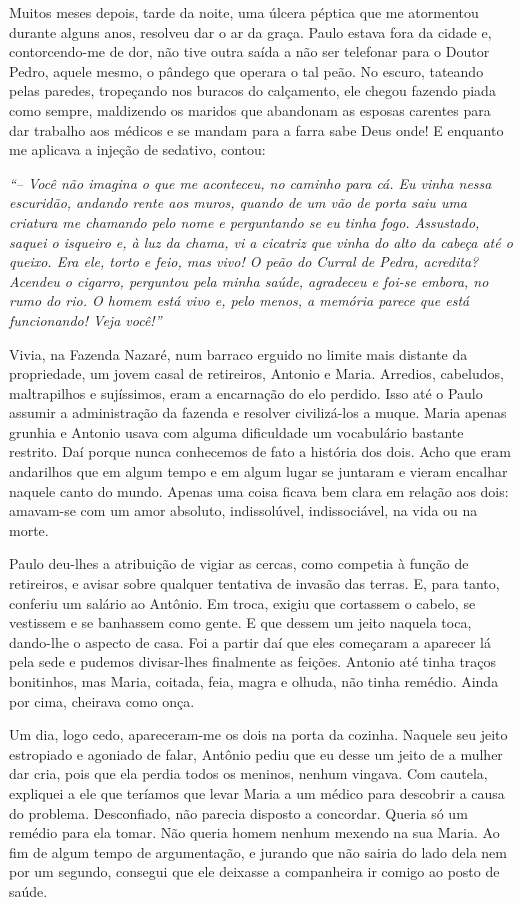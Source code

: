 Muitos meses depois, tarde da noite, uma úlcera péptica que me atormentou durante alguns anos, resolveu dar o ar da graça.
Paulo estava fora da cidade e, contorcendo-me de dor, não tive outra saída a não ser telefonar para o Doutor Pedro, aquele mesmo, o pândego que operara o tal peão.
No escuro, tateando pelas paredes, tropeçando nos buracos do calçamento, ele chegou fazendo piada como sempre, maldizendo os maridos que abandonam as esposas carentes para dar trabalho aos médicos e se mandam para a farra sabe Deus onde!  E enquanto me aplicava a injeção de sedativo, contou:

\textit{``-- Você não imagina o que me aconteceu, no caminho para cá.
Eu vinha nessa escuridão, andando rente aos muros, quando de um vão de porta saiu uma criatura me chamando pelo nome e perguntando se eu tinha fogo.
Assustado, saquei o isqueiro e, à luz da chama, vi a cicatriz que vinha do alto da cabeça até o queixo.
Era ele, torto e feio, mas vivo! O peão do Curral de Pedra, acredita? Acendeu o cigarro, perguntou pela minha saúde, agradeceu e foi-se embora, no rumo do rio.
O homem está vivo e, pelo menos, a memória parece que está funcionando! Veja você!'' }

Vivia, na Fazenda Nazaré, num barraco erguido no limite mais distante da propriedade, um jovem casal de retireiros, Antonio e Maria.
Arredios, cabeludos, maltrapilhos e sujíssimos, eram a encarnação do elo perdido.
Isso até o Paulo assumir a administração da fazenda e resolver civilizá-los a muque.
Maria apenas grunhia e Antonio usava com alguma dificuldade um vocabulário bastante restrito.
Daí porque nunca conhecemos de fato a história dos dois.
Acho que eram andarilhos que em algum tempo e em algum lugar se juntaram e vieram encalhar naquele canto do mundo.
Apenas uma coisa ficava bem clara em relação aos dois: amavam-se com um amor absoluto, indissolúvel, indissociável, na vida ou na morte.


Paulo deu-lhes a atribuição de vigiar as cercas, como competia à função de retireiros, e avisar sobre qualquer tentativa de invasão das terras.
E, para tanto, conferiu um salário ao Antônio.
Em troca, exigiu que cortassem o cabelo, se vestissem e se banhassem como gente.
E que dessem um jeito naquela toca, dando-lhe o aspecto de casa.
Foi a partir daí que eles começaram a aparecer lá pela sede e pudemos divisar-lhes finalmente as feições.
Antonio até tinha traços bonitinhos, mas Maria, coitada, feia, magra e olhuda, não tinha remédio.
Ainda por cima, cheirava como onça.

Um dia, logo cedo, apareceram-me os dois na porta da cozinha.
Naquele seu jeito estropiado e agoniado de falar, Antônio pediu que eu desse um jeito de a mulher dar cria, pois que ela perdia todos os meninos, nenhum vingava.
Com cautela, expliquei a ele que teríamos que levar Maria a um médico para descobrir a causa do problema.
Desconfiado, não parecia disposto a concordar.
Queria só um remédio para ela tomar.
Não queria homem nenhum mexendo na sua Maria.
Ao fim de algum tempo de argumentação, e jurando que não sairia do lado dela nem por um segundo, consegui que ele deixasse a companheira ir comigo ao posto de saúde.

